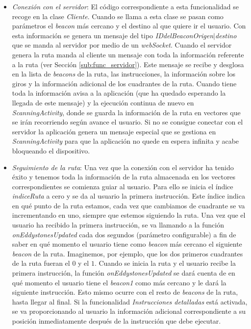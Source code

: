 \begin{itemize}
	
	\item \textit{Conexión con el servidor}: El código correspondiente a esta funcionalidad se recoge en la clase \textit{Cliente}. Cuando se llama a esta clase se pasan como parámetros el \textit{beacon} más cercano y el destino al que quiere ir el usuario. Con esta información se genera un mensaje del tipo \textit{IDdelBeaconOrigen$|$destino} que se manda al servidor por medio de un \textit{webSocket}. Cuando el servidor genera la ruta manda al cliente un mensaje con toda la información referente a la ruta (ver Sección \ref{sub:func_servidor}). Este mensaje se recibe y desglosa en la lista de \textit{beacons} de la ruta, las instrucciones, la información sobre los giros y la información adicional de los cuadrantes de la ruta. Cuando tiene toda la información avisa a la aplicación (que ha quedado esperando la llegada de este mensaje) y la ejecución continua de nuevo en \textit{ScanningActivity}, donde se guarda la información de la ruta en vectores que se irán recorriendo según avance el usuario. Si no se consigue conectar con el servidor la aplicación genera un mensaje especial que se gestiona en \textit{ScanningActivity} para que la aplicación no quede en espera infinita y acabe bloqueando el dispositivo.
	
	
	\item \textit{Seguimiento de la ruta}: Una vez que la conexión con el servidor ha tenido éxito y tenemos toda la información de la ruta almacenada en los vectores correspondientes se comienza guiar al usuario. Para ello se inicia el índice \textit{indiceRuta} a cero y se da al usuario la primera instrucción. Este índice indica en qué punto de la ruta estamos, cada vez que cambiamos de cuadrante se va incrementando en uno, siempre que estemos siguiendo la ruta. Una vez que el usuario ha recibido la primera instrucción, se va llamando a la función \textit{onEddystonesUpdated} cada dos segundos (parámetro configurable) a fin de saber en qué momento el usuario tiene como \textit{beacon} más cercano el siguiente \textit{beacon} de la ruta. Imaginemos, por ejemplo, que los dos primeros cuadrantes de la ruta fueran el $0$ y el $1$. Cuando se inicia la ruta y el usuario recibe la primera instrucción, la función \textit{onEddystonesUpdated} se dará cuenta de en qué momento el usuario tiene el \textit{beacon1} como más cercano y le dará la siguiente instrucción. Esto mismo ocurre con el resto de \textit{beacons} de la ruta, hasta llegar al final. Si la funcionalidad \textit{Instrucciones detalladas} está activada, se va proporcionando al usuario la información adicional correspondiente a su posición inmediatamente después de la instrucción que debe ejecutar.
	

\end{itemize}
